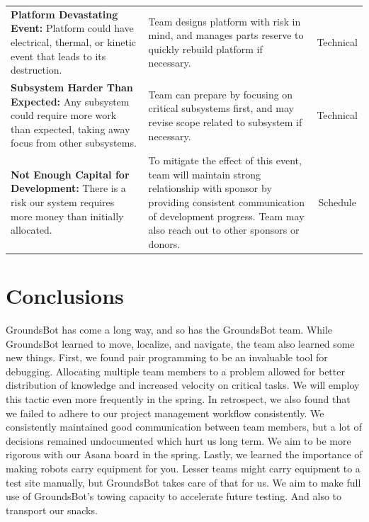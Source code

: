 \documentclass[12pt]{extarticle}
\begin{document}
\begin{table}[H]
\begin{tabular}{p{7cm}p{6cm}c}
 \textbf{Platform Devastating Event:} 
Platform could have electrical, thermal, or kinetic event that leads to its destruction.
&
Team designs platform with risk in mind, and manages parts reserve to quickly rebuild platform if necessary.
&
Technical\\

 \textbf{Subsystem Harder Than Expected:} 
Any subsystem could require more work than expected, taking away focus from other subsystems.
&
Team can prepare by focusing on critical subsystems first, and may revise scope related to subsystem if necessary.
&
Technical\\

\textbf{Not Enough Capital for Development:} 
There is a risk our system requires more money than initially allocated.
&
To mitigate the effect of this event, team will maintain strong relationship with sponsor by providing consistent communication of development progress. Team may also reach out to other sponsors or donors.
&
Schedule\\
\end{tabular}
\end{table}

\section{Conclusions}
GroundsBot has come a long way, and so has the GroundsBot team. While GroundsBot learned to move, localize, and navigate, the team also learned some new things. First, we found pair programming to be an invaluable tool for debugging. Allocating multiple team members to a problem allowed for better distribution of knowledge and increased velocity on critical tasks. We will employ this tactic even more frequently in the spring. In retrospect, we also found that we failed to adhere to our project management workflow consistently. We consistently maintained good communication between team members, but a lot of decisions remained undocumented which hurt us long term. We aim to be more rigorous with our Asana board in the spring. Lastly, we learned the importance of making robots carry equipment for you. Lesser teams might carry equipment to a test site manually, but GroundsBot takes care of that for us. We aim to make full use of GroundsBot's towing capacity to accelerate future testing. And also to transport our snacks.

\begingroup
\newpage
\end{document}
